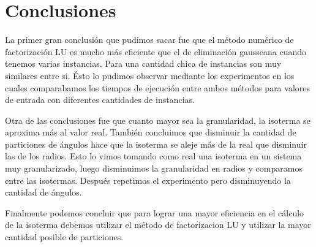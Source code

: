 \section{Conclusiones}

La primer gran conclusión que pudimos sacar fue que el método numérico de factorización LU es mucho más eficiente que el de eliminación gausseana cuando tenemos varias instancias. Para una cantidad chica de instancias son muy similares entre si. Ésto lo pudimos observar mediante los experimentos en los cuales comparabamos los tiempos de ejecución entre ambos métodos para valores de entrada con diferentes cantidades de instancias. 

Otra de las conclusiones fue que cuanto mayor sea la granularidad, la isoterma se aproxima más al valor real. También concluimos que disminuir la cantidad de particiones de ángulos hace que la isoterma se aleje más de la real que disminuir las de los radios. Esto lo vimos tomando como real una isoterma en un sistema muy granularizado, luego disminuimos la granularidad en radios y comparamos entre las isotermas. Después repetimos el experimento pero disminuyendo la cantidad de ángulos.

Finalmente podemos concluir que para lograr una mayor eficiencia en el cálculo de la isoterma debemos utilizar el método de factorizacion LU y utilizar la mayor cantidad posible de particiones.
